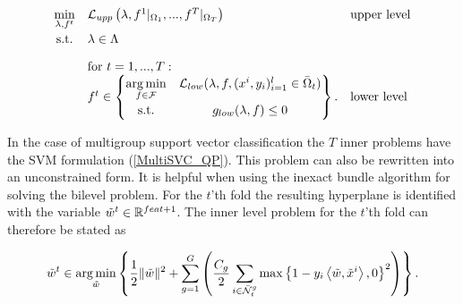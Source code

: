 
\begin{equation*}
	\begin{array}{cll}
	\displaystyle\min_{\lambda, f^t} & \mathcal{L}_{upp}\left(\lambda,f^1|_{\Omega_1},...,f^T|_{\Omega_T}\right) & \text{upper level} \vspace{0.5ex}\\
	\text{s.t.} & \lambda \in \Lambda & \vspace{1em}\\
	& \text{for } t = 1,...,T: & \\
	& f^t \in \begin{Bmatrix} \displaystyle\argmin_{f\in \mathcal{F}} & \mathcal{L}_{low}(\lambda,f,(x^i,y_i)_{i = 1}^l\in \bar{\Omega}_t) \vspace{0.5ex}\\
	                        \text{s.t.} & g_{low}(\lambda,f) \leq 0 
													\end{Bmatrix}. & \text{lower level}
	\end{array}
\end{equation*}

In the case of multigroup support vector classification the \(T\) inner problems have the SVM formulation %
(\ref{MultiSVC_QP}). %
This problem can also be rewritten into an unconstrained form. It is helpful when using the inexact bundle algorithm for solving the bilevel problem.
For the \(t\)'th fold the resulting hyperplane is identified with the variable \(\tilde{w}^t \in \mathbb{R}^{feat+1}\).
The inner level problem for the \(t\)'th fold can therefore be stated as



\begin{equation}
	\tilde{w}^t \in \operatorname*{arg\,min}_{\tilde{w}} \left\{\frac{1}{2} \|\tilde{w}\|^2+\sum_{g=1}^G\left(\frac{C_g}{2}\sum_{i\in \bar{\mathcal{N}}_t^g}{\max\left\{1-y_i\left\langle \tilde{w},\tilde{x}^i\right\rangle,0\right\}^2}\right)\right\}.
\label{lower_unconstr}
\end{equation}


